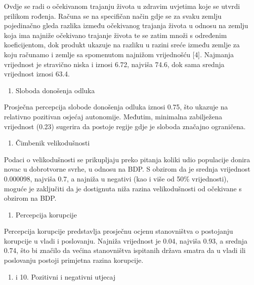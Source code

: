 \documentclass[11pt]{article}
\providecommand{\tightlist}{%
      \setlength{\itemsep}{0pt}\setlength{\parskip}{0pt}}
\begin{document}
Ovdje se radi o očekivanom trajanju života u zdravim uvjetima koje se
utvrdi prilikom rođenja. Računa se na specifičan način gdje se za svaku
zemlju pojedinačno gleda razlika između očekivanog trajanja života u
odnosu na zemlju koja ima najniže očekivano trajanje života te se zatim
množi s određenim koeficijentom, dok produkt ukazuje na razliku u razini
sreće između zemlje za koju računamo i zemlje sa spomenutom najnižom
vrijednošću {[}4{]}. Najmanja vrijednost je stravično niska i iznosi
6.72, najviša 74.6, dok sama srednja vrijednost iznosi 63.4.

\begin{enumerate}
\def\labelenumi{\arabic{enumi}.}
\setcounter{enumi}{4}
\tightlist
\item
  Sloboda donošenja odluka
\end{enumerate}

Prosječna percepcija slobode donošenja odluka iznosi 0.75, što ukazuje
na relativno pozitivan osjećaj autonomije. Međutim, minimalna
zabilježena vrijednost (0.23) sugerira da postoje regije gdje je sloboda
značajno ograničena.

\begin{enumerate}
\def\labelenumi{\arabic{enumi}.}
\setcounter{enumi}{5}
\tightlist
\item
  Čimbenik velikodušnosti
\end{enumerate}

Podaci o velikodušnosti se prikupljaju preko pitanja koliki udio
populacije donira novac u dobrotvorne svrhe, u odnosu na BDP. S obzirom
da je srednja vrijednost 0.000098, najviša 0.7, a najniža u negativi
(kao i više od 50\% vrijednosti), moguće je zaključiti da je dostignuta
niža razina velikodušnosti od očekivane s obzirom na BDP.

\begin{enumerate}
\def\labelenumi{\arabic{enumi}.}
\setcounter{enumi}{7}
\tightlist
\item
  Percepcija korupcije
\end{enumerate}

Percepcija korupcije predstavlja prosječnu ocjenu stanovništva o
postojanju korupcije u vladi i poslovanju. Najniža vrijednost je 0.04,
najviša 0.93, a srednja 0.74, što bi značilo da većina stanovništva
ispitanih država smatra da u vladi ili poslovanju postoji primjetna
razina korupcije.

\begin{enumerate}
\def\labelenumi{\arabic{enumi}.}
\setcounter{enumi}{8}
\tightlist
\item
  i 10. Pozitivni i negativni utjecaj
\end{enumerate}
\end{document}

